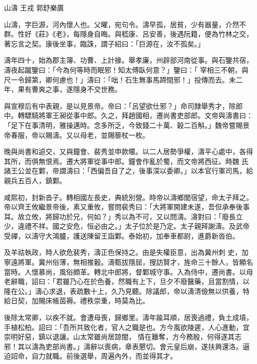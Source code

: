 
\begin{pinyinscope}
山濤
 王戎
 郭舒樂廣



 山濤，字巨源，河內懷人也。父曜，宛句令。濤早孤，居貧，少有器量，介然不群。性好《莊》《老》，每隱身自晦。與嵇康、呂安善，後遇阮籍，便為竹林之交，著忘言之契。康後坐事，臨誅，謂子紹曰：「巨源在，汝不孤矣。」



 濤年四十，始為郡主簿、功曹、上計掾。舉孝廉，州辟部河南從事。與石鑒共宿，濤夜起蹴鑒曰：「今為何等時而眠邪！知太傅臥何意？」鑒曰：「
 宰相三不朝，與尺一令歸第，卿何慮也！」濤曰：「咄！石生無事馬蹄間邪！」投傳而去。未二年，果有曹爽之事，遂隱身不交世務。



 與宣穆后有中表親，是以見景帝。帝曰：「呂望欲仕邪？」命司隸舉秀才，除郎中。轉驃騎將軍王昶從事中郎。久之，拜趙國相，遷尚書吏部郎。文帝與濤書曰：「足下在事清明，雅操邁時。念多所乏，今致錢二十萬、穀二百斛。」魏帝嘗賜景帝春服，帝以賜濤。又以母老，並賜藜杖一枚。



 晚與尚書和逌交，又與鐘會、裴秀並申款暱。以二人居勢爭權，濤平心處中，各得其所，而俱無恨焉。遷大將軍從事中郎。鐘會作亂於蜀，而文帝將西征。時魏
 氏諸王公並在鄴，帝謂濤曰：「西偏吾自了之，後事深以委卿。」以本官行軍司馬，給親兵五百人，鎮鄴。



 咸熙初，封新沓子。轉相國左長史，典統別營。時帝以濤鄉閭宿望，命太子拜之。帝以齊王攸繼景帝後，素又重攸，嘗問裴秀曰：「大將軍開建未遂，吾但承奉後事耳。故立攸，將歸功於兄，何如？」秀以為不可，又以問濤。濤對曰：「廢長立少，違禮不祥。國之安危，恒必由之。」太子位於是乃定。太子親拜謝濤。及武帝受禪，以濤守大鴻臚，護送陳留王詣鄴。泰始初，加奉車都尉，進爵新沓伯。



 及羊祜執政，時人欲危裴秀，濤正色保持之。由是失權臣意，出為冀州刺
 史，加寧遠將軍。冀州俗薄，無相推轂。濤甄拔隱屈，搜訪賢才，旌命三十餘人，皆顯名當時。人懷慕尚，風俗頗革。轉北中郎將，督鄴城守事。入為侍中，遷尚書。以母老辭職，詔曰：「君雖乃心在於色養，然職有上下，旦夕不廢醫藥，且當割情，以隆在公。」濤心求退，表疏數十上，久乃見聽。除議郎，帝以濤清儉無以供養，特給日契，加賜床帳茵褥。禮秩崇重，時莫為比。



 後除太常卿，以疾不就。會遭母喪，歸鄉里。濤年踰耳順，居喪過禮，負土成墳，手植松柏。詔曰：「吾所共致化者，官人之職是也。方今風欲陵遲，人心進動，宜崇明好惡，鎮以退讓。山太常雖尚居諒闇，
 情在難奪，方今務殷，何得遂其志邪！其以濤為吏部尚書。」濤辭以喪病，章表懇切。會元皇后崩，遂扶興還洛。逼迫詔命，自力就職。前後選舉，周遍內外，而並得其才。




\end{pinyinscope}
